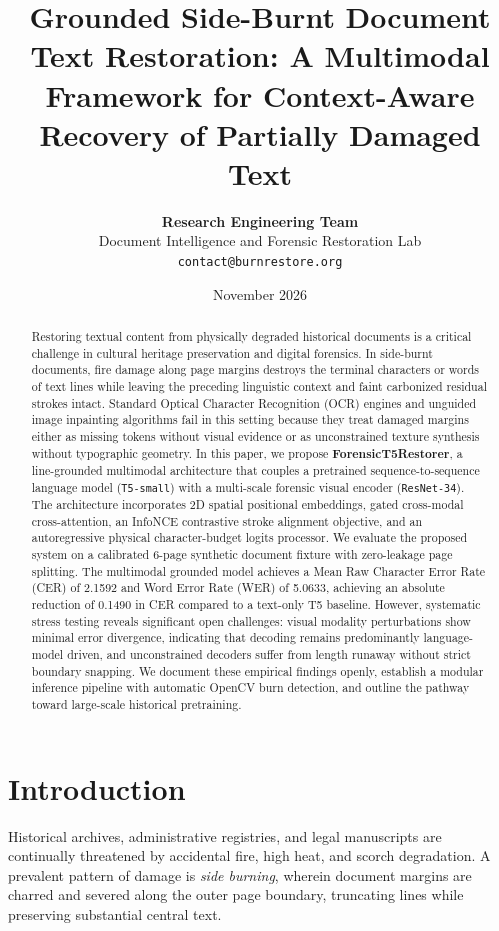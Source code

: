 \documentclass[10pt,twocolumn]{article}
\title{\textbf{Grounded Side-Burnt Document Text Restoration: A Multimodal Framework for Context-Aware Recovery of Partially Damaged Text}}
\author{
  \textbf{Research Engineering Team} \\
  Document Intelligence and Forensic Restoration Lab \\
  \texttt{contact@burnrestore.org}
}
\date{November 2026}
\begin{document}
\maketitle

\begin{abstract}
Restoring textual content from physically degraded historical documents is a critical challenge in cultural heritage preservation and digital forensics. In side-burnt documents, fire damage along page margins destroys the terminal characters or words of text lines while leaving the preceding linguistic context and faint carbonized residual strokes intact. Standard Optical Character Recognition (OCR) engines and unguided image inpainting algorithms fail in this setting because they treat damaged margins either as missing tokens without visual evidence or as unconstrained texture synthesis without typographic geometry. In this paper, we propose \textbf{ForensicT5Restorer}, a line-grounded multimodal architecture that couples a pretrained sequence-to-sequence language model (\texttt{T5-small}) with a multi-scale forensic visual encoder (\texttt{ResNet-34}). The architecture incorporates 2D spatial positional embeddings, gated cross-modal cross-attention, an InfoNCE contrastive stroke alignment objective, and an autoregressive physical character-budget logits processor. We evaluate the proposed system on a calibrated 6-page synthetic document fixture with zero-leakage page splitting. The multimodal grounded model achieves a Mean Raw Character Error Rate (CER) of 2.1592 and Word Error Rate (WER) of 5.0633, achieving an absolute reduction of 0.1490 in CER compared to a text-only T5 baseline. However, systematic stress testing reveals significant open challenges: visual modality perturbations show minimal error divergence, indicating that decoding remains predominantly language-model driven, and unconstrained decoders suffer from length runaway without strict boundary snapping. We document these empirical findings openly, establish a modular inference pipeline with automatic OpenCV burn detection, and outline the pathway toward large-scale historical pretraining.
\end{abstract}

\section{Introduction}
Historical archives, administrative registries, and legal manuscripts are continually threatened by accidental fire, high heat, and scorch degradation. A prevalent pattern of damage is \textit{side burning}, wherein document margins are charred and severed along the outer page boundary, truncating lines while preserving substantial central text. 
\end{document}
